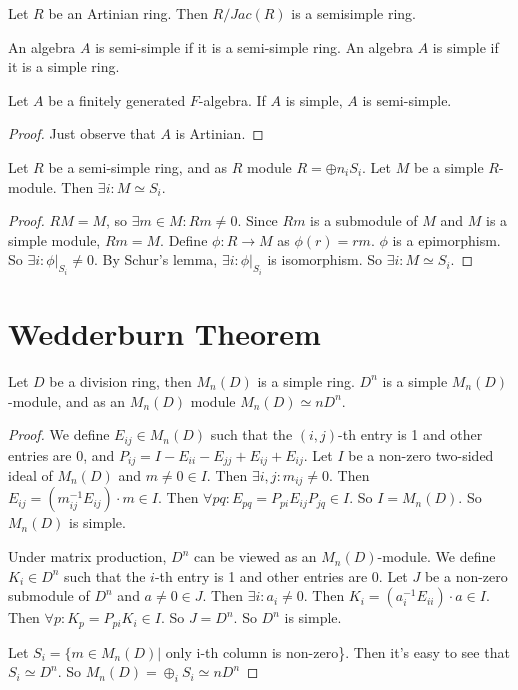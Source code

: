 \documentclass[12pt]{book}
\begin{document}
	\begin{corollary}
		Let $R$ be an Artinian ring. Then $R/Jac(R)$ is a semisimple ring.
	\end{corollary}
	
	\begin{definition}
		An algebra $A$ is semi-simple if it is a semi-simple ring. An algebra $A$ is simple if it is a simple ring.
	\end{definition}
	
	\begin{theorem}
		Let $A$ be a finitely generated $F$-algebra. If $A$ is simple, $A$ is semi-simple.
	\end{theorem}
	\begin{proof}
		Just observe that $A$ is Artinian.
	\end{proof}
	
	\begin{theorem}
		Let $R$ be a semi-simple ring, and as $R$ module $R=\oplus n_iS_i$. Let $M$ be a simple $R$-module. Then $\exists i: M\simeq S_i$.
	\end{theorem}
	
	\begin{proof}
		$RM=M$, so $\exists m\in M: Rm\neq 0$. Since $Rm$ is a submodule of $M$ and $M$ is a simple module, $Rm=M$. Define $\phi:R\rightarrow M$ as $\phi(r)=rm$. $\phi$ is a epimorphism. So $\exists i: \phi|_{S_i}\neq 0$. By Schur's lemma, $\exists i: \phi|_{S_i}$ is isomorphism. So $\exists i: M\simeq S_i$.
	\end{proof}
	
	\section{Wedderburn Theorem}

	\begin{theorem}
		Let $D$ be a division ring, then $M_n(D)$ is a simple ring. $D^n$ is a simple $M_n(D)$-module, and as an $M_n(D)$ module $M_n(D)\simeq nD^n$.
	\end{theorem}
	\begin{proof}
		We define $E_{ij}\in M_n(D)$ such that the $(i,j)$-th entry is 1 and other entries are 0, and $P_{ij}=I-E_{ii}-E_{jj}+E_{ij}+E_{ij}$. Let $I$ be a non-zero two-sided ideal of $M_n(D)$ and $m\neq 0\in I$. Then $\exists i,j:m_{ij}\neq0$. Then $E_{ij}=(m_{ij}^{-1}E_{ij})\cdot m\in I$. Then $\forall pq:E_{pq}=P_{pi}E_{ij}P_{jq}\in I$. So $I= M_n(D)$. So $M_n(D)$ is simple.
		
		Under matrix production, $D^n$ can be viewed as an $M_n(D)$-module. We define $K_{i}\in D^n$ such that the $i$-th entry is 1 and other entries are 0. Let $J$ be a non-zero submodule of $D^n$ and $a\neq 0\in J$. Then $\exists i:a_{i}\neq0$.  Then $K_{i}=(a_{i}^{-1}E_{ii})\cdot a\in I$. Then $\forall p:K_{p}=P_{pi}K_{i}\in I$. So $J= D^n$. So $D^n$ is simple.
		
		Let $S_i=\{m\in M_n(D)| $ only i-th column is non-zero\}. Then it's easy to see that $S_i\simeq D^n$. So $M_n(D)=\oplus_i S_i\simeq nD^n$
	\end{proof}
	
\end{document}
